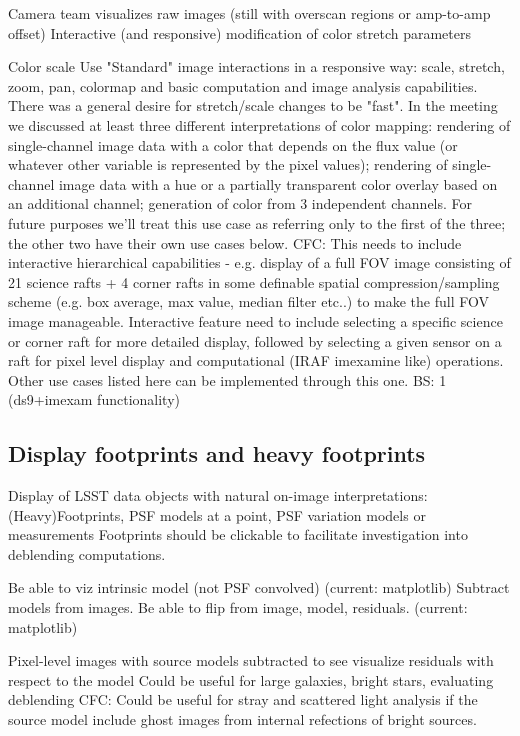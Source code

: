 Camera team visualizes raw images (still with overscan regions or amp-to-amp offset)
Interactive (and responsive) modification of color stretch parameters

Color scale
Use "Standard" image interactions in a responsive way: scale, stretch, zoom, pan, colormap and basic computation and image analysis capabilities.
There was a general desire for stretch/scale changes to be "fast".
In the meeting we discussed at least three different interpretations of color mapping: rendering of single-channel image data with a color that depends on the flux value (or whatever other variable is represented by the pixel values); rendering of single-channel image data with a hue or a partially transparent color overlay based on an additional channel; generation of color from 3 independent channels. For future purposes we'll treat this use case as referring only to the first of the three; the other two have their own use cases below.
CFC: This needs to include interactive hierarchical capabilities - e.g. display of a full FOV image consisting of 21 science rafts + 4 corner rafts in some definable spatial compression/sampling scheme (e.g. box average, max value, median filter etc..) to make the full FOV image manageable. Interactive feature need to include selecting a specific science or corner raft for more detailed display, followed by selecting a given sensor on a raft for pixel level display and computational (IRAF imexamine like) operations.
Other use cases listed here can be implemented through this one.
BS: 1 (ds9+imexam functionality)


\subsection{Display footprints and heavy footprints}
Display of LSST data objects with natural on-image interpretations: (Heavy)Footprints, PSF models at a point, PSF variation models or measurements
Footprints should be clickable to facilitate investigation into deblending computations.

Be able to viz intrinsic model (not PSF convolved) (current: matplotlib)
Subtract models from images. Be able to flip from image, model, residuals.   (current: matplotlib)

Pixel-level images with source models subtracted to see visualize residuals with respect to the model
Could be useful for large galaxies, bright stars, evaluating deblending
CFC: Could be useful for stray and scattered light analysis if the source model include ghost images from internal refections of bright sources.

